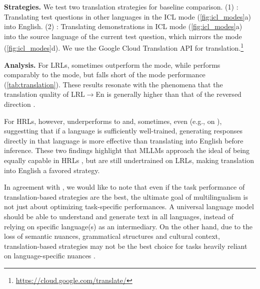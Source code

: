 \vspace{2pt}\noindent\textbf{Strategies.}
We test two translation strategies for baseline comparison.
(1) \transEn: Translating test questions in other languages in the \english ICL mode (\cref{fig:icl_modes}a) into English.
(2) \transSource: Translating demonstrations in \english ICL mode (\cref{fig:icl_modes}a) into the source language of the current test question, which mirrors the \native mode (\cref{fig:icl_modes}d).
We use the Google Cloud Translation API for translation.\footnote{\url{https://cloud.google.com/translate/}}


\vspace{2pt}\noindent\textbf{Analysis.}
For LRLs, \transEn sometimes outperform the \native mode, while \transSource performs comparably to the \multilingual mode, but falls short of the \native mode performance (\cref{tab:translation}).
These results resonate with the phenomena that the translation quality of LRL$\rightarrow$En is generally higher than that of the reversed direction \cite{beyond_english_centric_multilingual_mt,flores101,nllb}.

For HRLs, however, \transEn underperforms to \native and, sometimes, even \multilingual (e.g., on \mgsm), suggestting that if a language is sufficiently well-trained, generating responses directly in that language is more effective than translating into English before inference.
These two findings highlight that MLLMs approach the ideal of being equally capable in HRLs \cite{is_translation_all_you_need}, but are still undertrained on LRLs, making translation into English a favored strategy.

In agreement with \citet{roles_of_english}, we would like to note that even if the task performance of translation-based strategies are the best, the ultimate goal of multilingualism is not just about optimizing task-specific performances.
A universal language model should be able to understand and generate text in all languages, instead of relying on specific language(s) as an intermediary.
On the other hand, due to the loss of semantic nuances, grammatical structures and cultural context, translation-based strategies may not be the best choice for tasks heavily reliant on language-specific nuances \cite{is_translation_all_you_need}.
